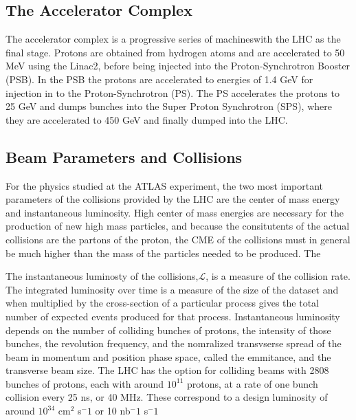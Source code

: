 \subsection{The Accelerator Complex}

The accelerator complex is a progressive series of machineswith the LHC as the final stage.
Protons are obtained from hydrogen atoms and are accelerated to 50 MeV using the
Linac2, before being injected into the Proton-Synchrotron Booster (PSB). In
the PSB the protons are accelerated to energies of 1.4 GeV for injection
in to the Proton-Synchrotron (PS). The PS accelerates the protons to 25 GeV
and dumps bunches into the Super Proton Synchrotron (SPS), where they 
are accelerated to 450 GeV and finally dumped into the LHC. 

\subsection{Beam Parameters and Collisions} 

For the physics studied at the ATLAS experiment, the two most important parameters of
the collisions provided by the LHC are the center of mass energy and instantaneous luminosity.
High center of mass energies are necessary for the production
of new high mass particles, and because the consitutents of the actual collisions
are the partons of the proton, the CME of the collisions must in general
be much higher than the mass of the particles needed to be produced. The

The instantaneous luminosty of the collisions,$\mathcal{L}$, is a measure of the
collision rate. The integrated luminosity over time is a measure of the size
of the dataset and when multiplied by the cross-section of a particular process
gives the total number of expected events produced for that process.
Instantaneous luminosity depends on the number of colliding bunches of protons,
the intensity of those bunches, the revolution
frequency, and the nomralized transvserse spread of the beam in momentum and position
phase space, called the emmitance, and the transverse beam size. The LHC has the
option for colliding beams with 2808 bunches of protons, each with around $10^11$ protons,
at a rate of one bunch collision every 25 ns, or 40 MHz. These correspond
to a design luminosity of around $10^34$ cm$^{2}$ s$^-1$ or 10 nb$^-1$ s$^-1$
  

